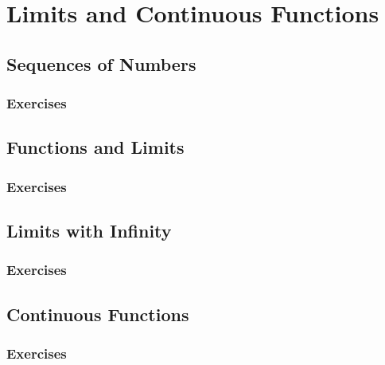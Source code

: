 \setcounter{chapter}{0}
\renewcommand{\thechapter}{2}
\chapter{Limits and Continuous Functions}\label{ch:2}
\setcounter{equation}{0}	        %

\section{Sequences of Numbers}\label{sec:2.1}
\subsection*{Exercises}\label{sec:2.1_Exercises}
\section{Functions and Limits}\label{sec:2.2}	
\subsection*{Exercises}\label{sec:2.2_Exercises}
\section{Limits with Infinity}\label{sec:2.3}	
\subsection*{Exercises}\label{sec:2.3_Exercises}
\section{Continuous Functions}\label{sec:2.4}	
\subsection*{Exercises}\label{sec:2.4_Exercises}
